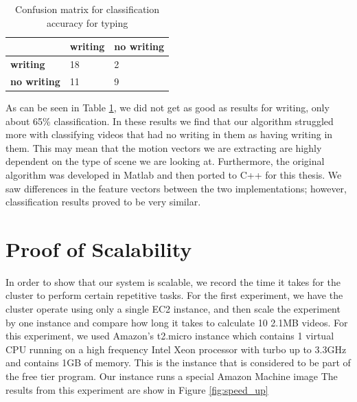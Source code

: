 
\FloatBarrier

\begin{table}[h]
  \begin{centering}
  \begin{tabular}{| l | l | l |}
  \hline
   & \textbf{writing} & \textbf{no writing}\\ \hline
  \textbf{writing} & 18 & 2 \\ \hline
  \textbf{no writing} & 11 & 9 \\ \hline
  \end{tabular}
  \caption{Confusion matrix for classification accuracy for typing}
  \label{tab:writing_confusion}
\end{centering}
\end{table}

As can be seen in Table \ref{tab:writing_confusion}, we did not get as good
as results for writing, only about 65\% classification. In these results we
find that our algorithm struggled more with classifying videos that had no
writing in them as having writing in them. This may mean that the motion vectors
we are extracting are highly dependent on the type of scene we are looking at. Furthermore,
the original algorithm was developed in Matlab and then ported to C++ for this thesis. We
saw differences in the feature vectors between the two implementations; however,
classification results proved to be very similar.

\section{\label{section:scalability}Proof of Scalability}
In order to show that our system is scalable, we record the time it takes
for the cluster to perform certain repetitive tasks. For the first experiment,
we have the cluster operate using only a single EC2 instance, and then scale
the experiment by one instance and compare how long it takes to calculate 10 2.1MB
videos. For this experiment, we used Amazon's t2.micro instance which contains
1 virtual CPU running on a high frequency Intel Xeon processor with turbo
up to 3.3GHz and contains 1GB of memory. This is the instance that is considered
to be part of the free tier program. Our instance runs a special Amazon Machine
image
The results from this experiment are show in Figure \ref{fig:speed_up}

